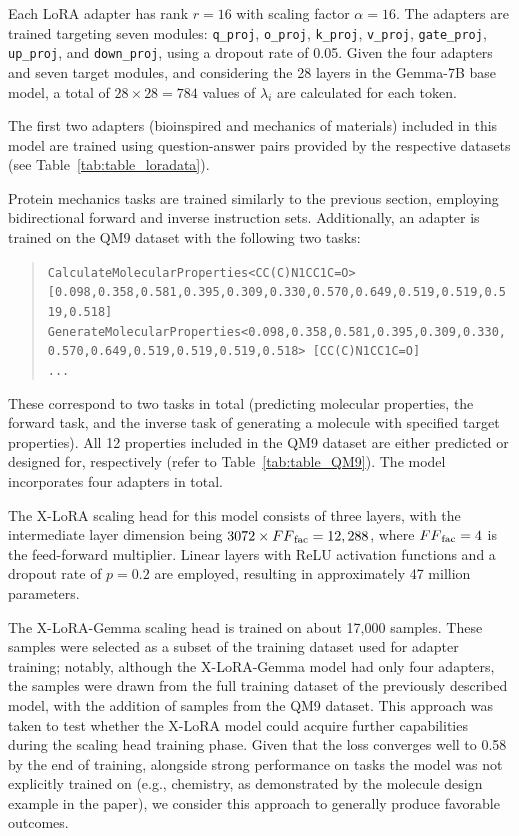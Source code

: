 Each LoRA adapter has rank $r=16$ with scaling factor $\alpha=16$. The adapters are trained targeting seven modules: \texttt{q\_proj}, \texttt{o\_proj}, \texttt{k\_proj}, \texttt{v\_proj}, \texttt{gate\_proj}, \texttt{up\_proj}, and \texttt{down\_proj}, using a dropout rate of 0.05. Given the four adapters and seven target modules, and considering the 28 layers in the Gemma-7B base model, a total of $28 \times 28 = 784$ values of $\lambda_i$ are calculated for each token.

The first two adapters (bioinspired and mechanics of materials) included in this model are trained using question-answer pairs provided by the respective datasets (see Table~\ref{tab:table_loradata}).

Protein mechanics tasks are trained similarly to the previous section, employing bidirectional forward and inverse instruction sets. Additionally, an adapter is trained on the QM9 dataset with the following two tasks:

\begin{quote}
\tiny {\texttt{CalculateMolecularProperties<CC(C)N1CC1C=O> [0.098,0.358,0.581,0.395,0.309,0.330,0.570,0.649,0.519,0.519,0.519,0.518]\\
GenerateMolecularProperties<0.098,0.358,0.581,0.395,0.309,0.330,0.570,0.649,0.519,0.519,0.519,0.518> [CC(C)N1CC1C=O]\\ 
...
}}
\end{quote}

These correspond to two tasks in total (predicting molecular properties, the forward task, and the inverse task of generating a molecule with specified target properties). All 12 properties included in the QM9 dataset are either predicted or designed for, respectively (refer to Table~\ref{tab:table_QM9}).  
The model incorporates four adapters in total.

The X-LoRA scaling head for this model consists of three layers, with the intermediate layer dimension being $3072\times {FF}_{\rm fac}=12,288$, where ${FF}_{\rm fac}=4$ is the feed-forward multiplier. Linear layers with ReLU activation functions and a dropout rate of $p=0.2$ are employed, resulting in approximately 47 million parameters.

The X-LoRA-Gemma scaling head is trained on about 17,000 samples. These samples were selected as a subset of the training dataset used for adapter training; notably, although the X-LoRA-Gemma model had only four adapters, the samples were drawn from the full training dataset of the previously described model, with the addition of samples from the QM9 dataset. This approach was taken to test whether the X-LoRA model could acquire further capabilities during the scaling head training phase. Given that the loss converges well to 0.58 by the end of training, alongside strong performance on tasks the model was not explicitly trained on (e.g., chemistry, as demonstrated by the molecule design example in the paper), we consider this approach to generally produce favorable outcomes.

